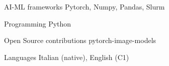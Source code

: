 
\begin{cvskills}

  \cvskill
    {AI-ML frameworks} %
    {Pytorch, Numpy, Pandas, Slurm} %

  \cvskill
    {Programming} %
    {Python} %
  
  \cvskill
    {Open Source contributions} %
    {pytorch-image-models} %

  \cvskill
    {Languages} %
    {Italian (native), English (C1)} %

\end{cvskills}
